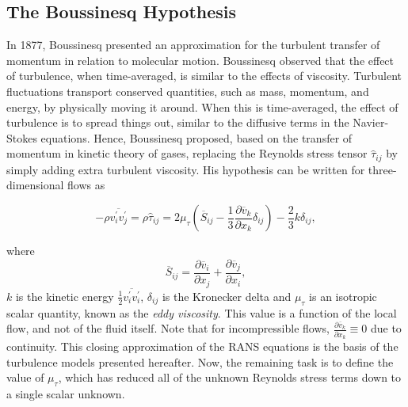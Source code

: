 \subsection{The Boussinesq Hypothesis}
In 1877, Boussinesq presented an approximation for the turbulent transfer of momentum in relation to molecular motion. Boussinesq observed that the effect of turbulence, when time-averaged, is similar to the effects of viscosity. Turbulent fluctuations transport conserved quantities, such as mass, momentum, and energy, by physically moving it around. When this is time-averaged, the effect of turbulence is to spread things out, similar to the diffusive terms in the Navier-Stokes equations. Hence, Boussinesq proposed, based on the transfer of momentum in kinetic theory of gases, replacing the Reynolds stress tensor $\hat \tau_{ij}$ by simply adding extra turbulent viscosity.  His hypothesis can be written for three-dimensional flows as
\begin{eqBox}
\begin{equation}
    -\rho \overline{v_i^\prime v_j^\prime} = \rho \hat \tau_{ij} =
        2 \mu_\tau \left(\overline S_{ij} - \frac{1}{3} \frac{\partial \overline v_k}{\partial x_k}\delta_{ij}
        \right) - \frac{2}{3} k \delta_{ij},
    \label{eq:boussinesq_approximation}
\end{equation}
\end{eqBox}
where
\begin{equation}
    \overline S_{ij} = 
    \frac{\partial \overline v_i}{\partial x_j} 
		+ \frac{\partial \overline v_j}{\partial x_i},
		\label{eq:meanstrainrate}
\end{equation}
$k$ is the kinetic energy $\frac{1}{2}\overline{v_i^\prime v_i^\prime}$, $\delta_{ij}$ is the Kronecker delta and $\mu_\tau$ is an isotropic scalar quantity, known as the \textit{eddy viscosity}. This value is a function of the local flow, and not of the fluid itself. Note that for incompressible flows, $\frac{\partial \overline v_k}{\partial x_k}\equiv0$ due to continuity. This closing approximation of the RANS equations is the basis of the turbulence models presented hereafter. Now, the remaining task is to define the value of $\mu_\tau$, which has reduced all of the unknown Reynolds stress terms down to a single scalar unknown. 

